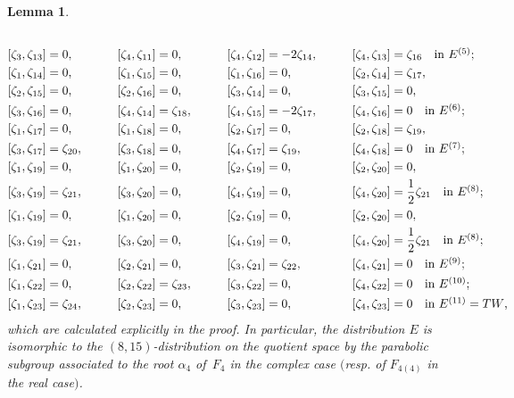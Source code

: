 \documentclass[pdftex]{sigma}
\numberwithin{equation}{section}
\newtheorem{Lemma}[Theorem]{Lemma}
\theoremstyle{definition}
\newcommand{\0}{\boldsymbol{0}}
\begin{document}
\begin{Lemma}
\begin{alignat*}{8}
\\
&[\zeta_3, \zeta_{13}] = 0,\qquad&& [\zeta_4, \zeta_{11}] = 0,\qquad&&
[\zeta_4, \zeta_{12}] = -2 \zeta_{14},\qquad&& [\zeta_4, \zeta_{13}] = \zeta_{16} \quad \makebox[0pt][l]{\text{in $E^{(5)}$;}}&
\\
&[\zeta_1, \zeta_{14}] = 0,\qquad&& [\zeta_1, \zeta_{15}] = 0,\qquad&& [\zeta_1, \zeta_{16}] = 0,\qquad&& [\zeta_2, \zeta_{14}] = \zeta_{17},&\\
& [\zeta_2, \zeta_{15}] = 0,\qquad&& [\zeta_2, \zeta_{16}] = 0,\qquad&& [\zeta_3, \zeta_{14}] = 0,\qquad&&[\zeta_3, \zeta_{15}] = 0,&
 \\
&[\zeta_3, \zeta_{16}] = 0,\qquad&& [\zeta_4, \zeta_{14}] = \zeta_{18},\qquad&& [\zeta_4, \zeta_{15}] = -2\zeta_{17},\qquad&&
[\zeta_4, \zeta_{16}] = 0 \quad \makebox[0pt][l]{\text{in $E^{(6)}$;}}&
\\
&[\zeta_1, \zeta_{17}] = 0,\qquad&& [\zeta_1, \zeta_{18}] = 0,\qquad&& [\zeta_2, \zeta_{17}] = 0,\qquad&& [\zeta_2, \zeta_{18}] = \zeta_{19},&\\
&[\zeta_3, \zeta_{17}] = \zeta_{20},\qquad&& [\zeta_3, \zeta_{18}] = 0,\qquad&& [\zeta_4, \zeta_{17}] = \zeta_{19},\qquad&&
 [\zeta_4, \zeta_{18}] = 0 \quad \makebox[0pt][l]{\text{in $E^{(7)}$;}}&
 \\
&[\zeta_1, \zeta_{19}] = 0,\qquad&& [\zeta_1, \zeta_{20}] = 0,\qquad&& [\zeta_2, \zeta_{19}] = 0,\qquad&& [\zeta_2, \zeta_{20}] = 0,&\\
&[\zeta_3, \zeta_{19}] = \zeta_{21},\qquad&& [\zeta_3, \zeta_{20}] = 0,\qquad&&[\zeta_4, \zeta_{19}] = 0,\qquad&&
 [\zeta_4, \zeta_{20}] = \frac{1}{2}\zeta_{21} \quad \makebox[0pt][l]{\text{in $E^{(8)}$;}}&
 \\
&[\zeta_1, \zeta_{19}] = 0,\qquad&& [\zeta_1, \zeta_{20}] = 0,\qquad&& [\zeta_2, \zeta_{19}] = 0,\qquad&& [\zeta_2, \zeta_{20}] = 0,&
 \\
& [\zeta_3, \zeta_{19}] = \zeta_{21},\qquad&& [\zeta_3, \zeta_{20}] = 0,\qquad&&[\zeta_4, \zeta_{19}] = 0,\qquad&&
 [\zeta_4, \zeta_{20}] = \frac{1}{2}\zeta_{21} \quad \makebox[0pt][l]{\text{in $E^{(8)}$;}}&
 \\
&[\zeta_1, \zeta_{21}] = 0,\qquad&& [\zeta_2, \zeta_{21}] = 0,\qquad&& [\zeta_3, \zeta_{21}] = \zeta_{22},\qquad&& [\zeta_4, \zeta_{21}] = 0
 \quad \makebox[0pt][l]{\text{in $E^{(9)}$;}}&
 \\
&[\zeta_1, \zeta_{22}] = 0,\qquad&& [\zeta_2, \zeta_{22}] = \zeta_{23},\qquad&& [\zeta_3, \zeta_{22}] = 0,\qquad&& [\zeta_4, \zeta_{22}] = 0
\quad \makebox[0pt][l]{\text{in $E^{(10)}$;}}&
 \\
&[\zeta_1, \zeta_{23}] = \zeta_{24},\qquad&& [\zeta_2, \zeta_{23}] = 0,\qquad&& [\zeta_3, \zeta_{23}] = 0,\qquad&& [\zeta_4, \zeta_{23}] = 0
 \quad \makebox[0pt][l]{\text{in $E^{(11)} = TW$,}}&
\end{alignat*}
which are calculated explicitly in the proof.
In particular, the distribution $E$ is isomorphic to the $(8, 15)$-distribution on
the quotient space by the parabolic subgroup associated to the root $\alpha_4$ of~$F_4$ in the complex case $($resp.
of $F_{4(4)}$ in the real case$)$.
\end{Lemma}
\end{document}
